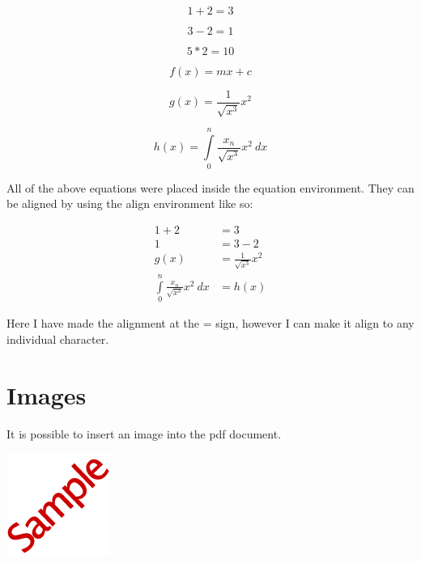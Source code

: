 \documentclass[12pt, letterpaper]{article}
\begin{document}
\begin{equation*}
1 + 2 = 3
\end{equation*}

\begin{equation*}
3 - 2 = 1
\end{equation*}

\begin{equation*}
5 * 2 = 10
\end{equation*}

\begin{equation*}
f(x) = mx + c
\end{equation*}

\begin{equation*}
g(x) = \frac{1}{\sqrt{x^3}}x^2
\end{equation*}

\begin{equation*}
h(x) = \int\limits_0^n \frac{x_{n}}{\sqrt{x^3}}x^2 \ dx
\end{equation*}

All of the above equations were placed inside the equation environment.
They can be aligned by using the align environment like so:

\begin{align*}
1 + 2 &= 3\\
1 &= 3 - 2\\
g(x) &= \frac{1}{\sqrt{x^3}}x^2\\
\int\limits_0^n \frac{x_{n}}{\sqrt{x^3}}x^2 \ dx &= h(x) 
\end{align*}

Here I have made the alignment at the = sign, however I can make it align to any individual character.

\newpage
\section{Images}
It is possible to insert an image\cite{images} into the pdf document.
\begin{center}
\includegraphics{sampleSmall}
\end{center}
\end{document}
